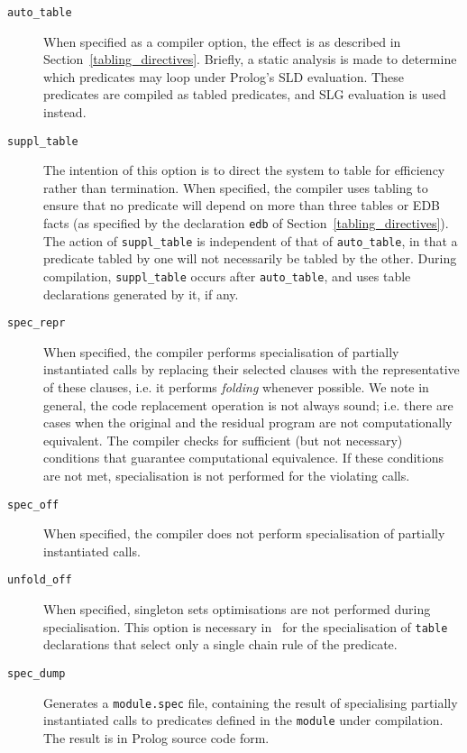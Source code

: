 \begin{description}
\item[{\tt auto\_table}] When specified as a
  compiler option, the effect is as described in
  Section~\ref{tabling_directives}.  Briefly, a static analysis is made to
  determine which predicates may loop under Prolog's SLD evaluation.  These
  predicates are compiled as tabled predicates, and SLG evaluation is used
  instead.
\item[{\tt suppl\_table}] The intention of this
  option is to direct the system to table for efficiency rather than
  termination.  When specified, the compiler uses tabling to ensure that no
  predicate will depend on more than three tables or EDB facts (as
  specified by the declaration {\tt edb} of
  Section~\ref{tabling_directives}).  The action of {\tt suppl\_table} is
  independent of that of {\tt auto\_table}, in that a predicate tabled by
  one will not necessarily be tabled by the other.  During compilation,
  {\tt suppl\_table} occurs after {\tt auto\_table}, and uses table
  declarations generated by it, if any.
\item[{\tt spec\_repr}]
	When specified, the compiler performs specialisation of partially
	instantiated calls by replacing their selected clauses with the
	representative of these clauses, i.e. it performs {\em folding\/}
	whenever possible.  We note in general, the code replacement
	operation is not always sound; i.e. there
	are cases when the original and the residual program are not
	computationally equivalent.  The compiler checks for sufficient (but
	not necessary) conditions that guarantee computational equivalence.
	If these conditions are not met, specialisation is not performed
	for the violating calls.
\item[{\tt spec\_off}]
	When specified, the compiler does not perform specialisation of
	partially instantiated calls.
\item[{\tt unfold\_off}]
	When specified, singleton sets optimisations are not performed
	during specialisation.  This option is necessary in \version\
	for the specialisation of {\tt table} declarations that select
	only a single chain rule of the predicate.
\item[{\tt spec\_dump}]
	Generates a {\tt module.spec} file, containing the result of
	specialising partially instantiated calls to predicates defined
	in the {\tt module} under compilation.  The result is in Prolog
	source code form.


\end{description}
